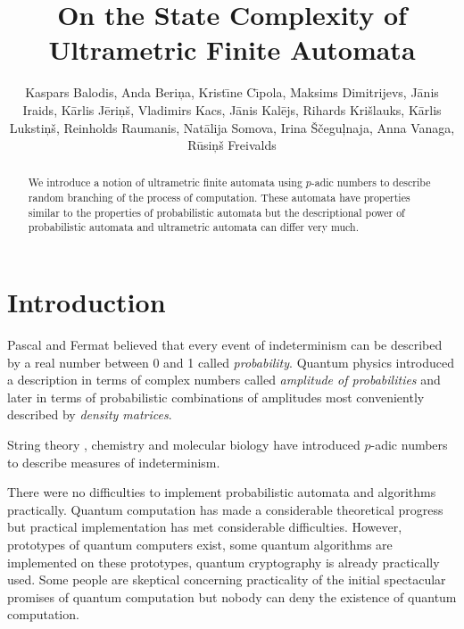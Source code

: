 \documentclass{llncs}
\begin{document}
\title{On the State Complexity of Ultrametric Finite Automata}


\author{
Kaspars Balodis,
Anda Beri\c na,
Krist\= \i ne C\= \i pola,
Maksims Dimitrijevs,
J\= anis Iraids,
K\= arlis J\= eri\c n\v s,
Vladimirs Kacs,
J\= anis Kal\= ejs,
Rihards Kri\v slauks,
K\= arlis Luksti\c n\v s,
Reinholds Raumanis,
Nat\= alija Somova,
Irina \v S\v cegu\c lnaja,
Anna Vanaga,
R\= usi\c n\v s Freivalds}



\maketitle

\begin{abstract}  
We introduce a notion of ultrametric finite automata using $p$-adic numbers to describe random branching of the process of computation. These automata have properties similar to the properties of probabilistic automata but the descriptional power of probabilistic automata and ultrametric automata can differ very much.
\end{abstract} 



\section{Introduction} 

Pascal and Fermat believed that every event of indeterminism can be described by a real number between 0 and 1 called 
{\em probability}. Quantum physics introduced a description in terms of complex numbers called {\em amplitude of 
probabilities} and later in terms of probabilistic combinations of amplitudes most conveniently described by {\em density
matrices}.

String theory \cite{VVZ95}, chemistry \cite{K06} and molecular biology \cite{DD09,Kh97} have introduced $p$-adic numbers to describe
measures of indeterminism. 

There were no difficulties to implement probabilistic automata and algorithms practically. Quantum computation \cite{H01}  has made a considerable
theoretical progress but practical implementation has met considerable difficulties. However, prototypes of quantum computers exist, some
quantum algorithms are implemented on these prototypes, quantum cryptography is already practically used. Some people are skeptical concerning
practicality of the initial spectacular promises of quantum computation but nobody can deny the existence of quantum computation.
\end{document}
